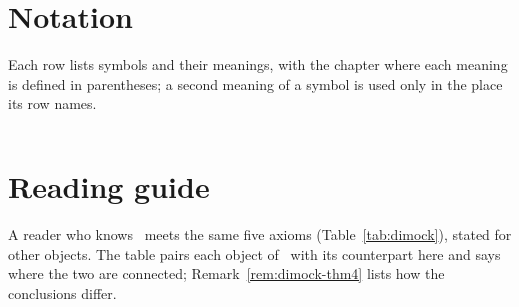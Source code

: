 \documentclass[11pt]{article}
\numberwithin{equation}{section}
\newif\ifdimockedition
\theoremstyle{definition}
\theoremstyle{remark}
\theoremstyle{plain}
\newcommand{\revm}[1]{#1}  %
\newcommand{\revs}[1]{#1}  %
\begin{document}
\section*{Notation}
\noindent \revm{Each row lists symbols and their meanings, with the chapter where each meaning is
defined in parentheses; a second meaning of a symbol is used only in the place its row names.}
{\small
\ifdimockedition\def\notationfile{notation-dimock}\else\def\notationfile{notation-full}\fi
\begin{longtable}{@{}l>{\raggedright\arraybackslash}p{}@{}}

\end{longtable}}

\section*{Reading guide}
\noindent\revs{A reader who knows~\cite{dimock} meets the same five axioms
(Table~\ref{tab:dimock}), stated for other objects. The table pairs each object of~\cite{dimock}
with its counterpart here and says where the two are connected; Remark~\ref{rem:dimock-thm4} lists
how the conclusions differ.}
\end{document}
